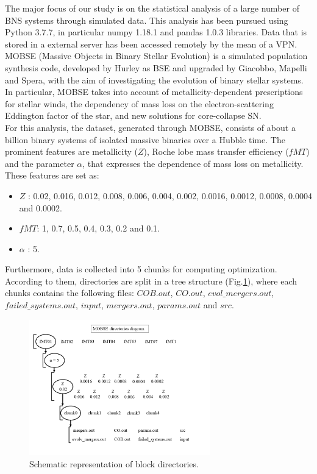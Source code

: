 \documentclass[preprint,12pt]{elsarticle}
\begin{document}
The major focus of our study is on the statistical analysis of a large number of BNS systems through simulated data. This analysis has been pursued using Python 3.7.7, in particular numpy 1.18.1 and pandas 1.0.3 libraries. Data that is stored in a external server has been accessed remotely by the mean of a VPN.\\

MOBSE (Massive Objects in Binary Stellar Evolution) is a simulated population synthesis code, developed by Hurley as BSE\citep{Hurley:2002} and upgraded by Giacobbo, Mapelli and Spera\citep{Giacobbo:2017}, with the aim of investigating the evolution of binary stellar systems. In particular, MOBSE takes into account of metallicity-dependent prescriptions for stellar winds, the dependency of mass loss on the electron-scattering Eddington factor of the star, and new solutions for core-collapse SN. \\

For this analysis, the dataset, generated through MOBSE, consists of about a billion binary systems of isolated massive binaries over a Hubble time. The prominent features are metallicity ($Z$), Roche lobe mass transfer efficiency ($fMT$) and the parameter $\alpha$, that expresses the dependence of mass loss on metallicity. These features are set as:
\begin{itemize}
    \item $Z$ : 0.02, 0.016, 0.012, 0.008, 0.006, 0.004, 0.002, 0.0016, 0.0012, 0.0008, 0.0004 and 0.0002.
    \item $fMT$: 1, 0.7, 0.5, 0.4, 0.3, 0.2 and 0.1.
    \item $\alpha$ : 5.
\end{itemize}
Furthermore, data is collected into 5 chunks for computing optimization. According to them, directories are split in a tree structure (Fig.\ref{img:Mobsediagram}), where
each chunks contains the following files: $COB.out$, $CO.out$, $evol\_mergers.out$, $failed\_systems.out$, $input$, $mergers.out$, $params.out$ and $src$. 

\begin{figure}[htp]
\centering
\includegraphics[width = 0.7\textwidth]{Images/MOBSE_diagram.png}
\caption[Methods]{Schematic representation of block directories.}
\label{img:Mobsediagram}
\end{figure}
\end{document}
